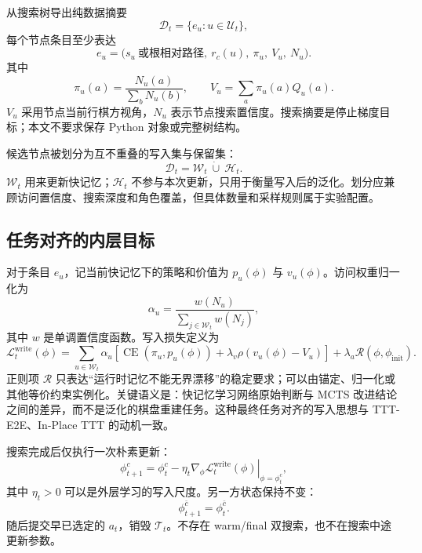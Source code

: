 \documentclass[UTF8,11pt,a4paper]{ctexart}
\newcommand{\memoryinit}{\phi_{\mathrm{init}}}
\newcommand{\CE}{\operatorname{CE}}
\begin{document}
从搜索树导出纯数据摘要
\[
  \mathcal D_t=\{e_u:u\in\mathcal U_t\},
\]
每个节点条目至少表达
\[
  e_u=\bigl(s_u\ \text{或根相对路径},\ r_c(u),\ \pi_u,\ V_u,\ N_u\bigr).
\]
其中
\[
  \pi_u(a)=\frac{N_u(a)}{\sum_bN_u(b)},\qquad
  V_u=\sum_a\pi_u(a)Q_u(a).
\]
$V_u$ 采用节点当前行棋方视角，$N_u$ 表示节点搜索置信度。搜索摘要是停止梯度目标；本文不要求保存 Python 对象或完整树结构。

候选节点被划分为互不重叠的写入集与保留集：
\[
  \mathcal D_t=\mathcal W_t\ \dot\cup\ \mathcal H_t.
\]
$\mathcal W_t$ 用来更新快记忆；$\mathcal H_t$ 不参与本次更新，只用于衡量写入后的泛化。划分应兼顾访问置信度、搜索深度和角色覆盖，但具体数量和采样规则属于实验配置。

\subsection{任务对齐的内层目标}

对于条目 $e_u$，记当前快记忆下的策略和价值为 $p_u(\phi)$ 与 $v_u(\phi)$。访问权重归一化为
\[
  \alpha_u=\frac{w(N_u)}{\sum_{j\in\mathcal W_t}w(N_j)},
\]
其中 $w$ 是单调置信度函数。写入损失定义为
\[
  \mathcal L_t^{\mathrm{write}}(\phi)
  =\sum_{u\in\mathcal W_t}\alpha_u
    \left[
      \CE\!\left(\pi_u,p_u(\phi)\right)
      +\lambda_v\rho\!\left(v_u(\phi)-V_u\right)
    \right]
    +\lambda_a\mathcal R(\phi,\memoryinit).
\]
正则项 $\mathcal R$ 只表达“运行时记忆不能无界漂移”的稳定要求；可以由锚定、归一化或其他等价约束实例化。关键语义是：快记忆学习网络原始判断与 MCTS 改进结论之间的差异，而不是泛化的棋盘重建任务。这种最终任务对齐的写入思想与 TTT-E2E、In-Place TTT 的动机一致\cite{ttte2e,inplace}。

搜索完成后仅执行一次朴素更新：
\[
  \phi^c_{t+1}
  =\phi^c_t-\eta_t
   \left.\nabla_{\phi}\mathcal L_t^{\mathrm{write}}(\phi)
   \right|_{\phi=\phi^c_t},
\]
其中 $\eta_t>0$ 可以是外层学习的写入尺度。另一方状态保持不变：
\[
  \phi^{\bar c}_{t+1}=\phi^{\bar c}_t.
\]
随后提交早已选定的 $a_t$，销毁 $\mathcal T_t$。不存在 warm/final 双搜索，也不在搜索中途更新参数。
\end{document}
